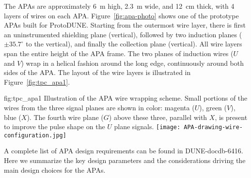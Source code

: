 The APAs are approximately \SI{6}{m} high, \SI{2.3}{m} wide, and \SI{12}{cm} thick, with 4 layers of wires on each APA.  Figure~\ref{fig:apa-photo} shows one of the prototype APAs built for ProtoDUNE. Starting from the outermost wire layer, there is first an uninstrumented shielding plane (vertical), followed by two induction planes ($\pm 35.7^{\circ}$ to the vertical), and finally the collection plane (vertical). All wire layers span the entire height of the APA frame. The two planes of induction wires ($U$ and $V$) wrap in a helical fashion around the long edge, continuously around both sides of the APA. The layout of the wire layers is illustrated in Figure~\ref{fig:tpc_apa1}.  


\begin{dunefigure}{fig:tpc_apa1}
{Illustration of the APA wire wrapping scheme. Small portions of the wires from the three signal planes are shown in color: magenta ($U$), green ($V$), blue ($X$). The fourth wire plane ($G$) above these three, parallel with $X$, is present to improve the pulse shape on the $U$ plane signals.} %
\texttt{[image: APA-drawing-wire-configuration.jpg]} 
\end{dunefigure}

A complete list of APA design requirements can be found in DUNE-docdb-6416. Here we summarize the key design parameters and the considerations driving the main design choices for the APAs.  

